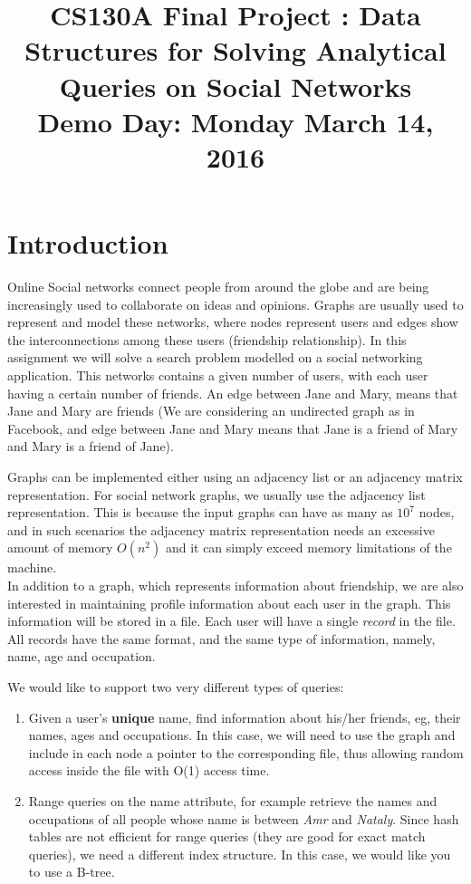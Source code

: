 \documentclass[times, 12pt]{article}
\begin{document}
\title{CS130A Final Project : Data Structures for Solving Analytical Queries on Social Networks \\Demo Day: Monday March 14, 2016 }
\maketitle
\section{Introduction}
Online Social networks connect people from around the globe and are being increasingly
used to collaborate on ideas and opinions.  Graphs are usually used to represent and model these networks, where nodes represent users and edges show the interconnections among these users (friendship relationship). In this assignment we will solve a search problem modelled on a social networking application.
This networks contains a given number of users, with each user having a certain number of friends. An edge between Jane and Mary, means that Jane and Mary are friends (We are considering an undirected graph as in Facebook, and edge between Jane and Mary means that Jane is a friend of Mary and Mary is a friend of Jane).

Graphs can be implemented either using an adjacency list or an adjacency matrix representation. For social network graphs, we usually use the adjacency list representation. This is because the input graphs can have as many as $10^{7}$ nodes, and in such scenarios the adjacency matrix representation needs an excessive amount of memory $O(n^{2})$ and it can simply exceed memory limitations of the machine.\\

In addition to a graph, which represents information about friendship, we are also interested in maintaining profile information about each user in the graph. This information will be stored in a file. Each user will have a single {\em record} in the file. All records have the same format, and the same type of information, namely, name, age and occupation.  

We would like to support two very different types of queries:
\begin{enumerate}
    \item  Given a user's \textbf{unique} name, find information about his/her friends, eg, their names, ages and occupations.  In this case, we will need to use the graph and include in each node a pointer to the corresponding file, thus allowing random access inside the file with O(1) access time.
    \item Range queries on the name attribute, for example retrieve the names and occupations of all people whose name is between {\em Amr} and {\em Nataly}.  Since hash tables are not efficient for range queries (they are good for exact match queries), we need a different index structure.  In this case, we would like you to use a B-tree.
\end{enumerate}
\end{document}

